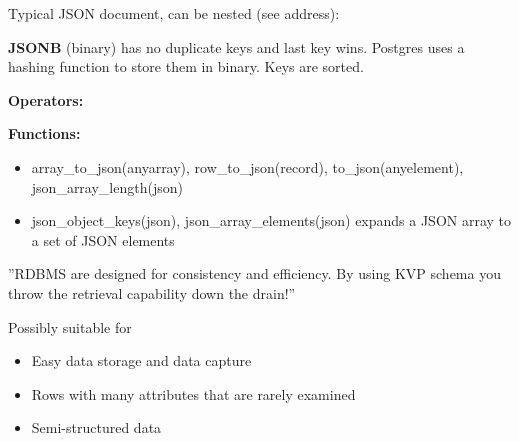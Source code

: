 \begin{breakbox}

Typical JSON document, can be nested (see address):

\textbf{JSONB} (binary) has no duplicate keys and last key wins. Postgres uses a hashing function to store them in binary. Keys are sorted.

\textbf{Operators:}

\textbf{Functions:}
	\begin{itemize}
		\item array\_to\_json(anyarray), row\_to\_json(record), to\_json(anyelement), json\_array\_length(json)
		\item json\_object\_keys(json), json\_array\_elements(json) expands a JSON array to a set of JSON elements
	\end{itemize}
\end{breakbox}

\begin{breakbox}
\end{breakbox}

\begin{breakbox}

''RDBMS are designed for consistency and efficiency. By using KVP schema you throw the retrieval capability down the drain!''

Possibly suitable for
\begin{itemize}
	\item Easy data storage and data capture
	\item Rows with many attributes that are rarely examined
	\item Semi-structured data
\end{itemize}


\end{breakbox}